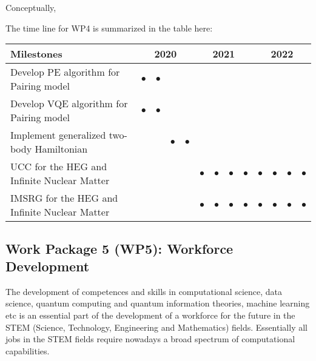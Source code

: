 \documentclass[10pt]{article}
\newcommand{\tbd}[1]{{\color{red}#1}}
\begin{document}
Conceptually, 




The time line for WP4 is summarized in the table here:
\begin{footnotesize}
\begin{center}
\begin{tabular}{|l|c|c|c|c|c|c|c|c|c|c|c|c|}
\hline
\multicolumn{1}{|l}{Milestones } & \multicolumn{4}{|c|}{ 2020 } & \multicolumn{4}{c|}{ 2021 } & \multicolumn{4}{c|}{ 2022 } \\
\hline
Develop PE algorithm for Pairing model &$\bullet$ &$\bullet$ && & & & & & & & &  \\
\hline
Develop VQE algorithm for Pairing model &$\bullet$  & $\bullet$ & & &  & & & & & &  \\
\hline
Implement generalized two-body Hamiltonian & & &$\bullet$  & $\bullet$ & & & & & & & &  \\

\hline
UCC for the HEG and Infinite Nuclear Matter & && & &$\bullet$  &$\bullet$ &$\bullet$  &$\bullet$  &$\bullet$  &$\bullet$ &$\bullet$  &$\bullet$   \\
\hline
IMSRG for the HEG and Infinite Nuclear Matter & && & &$\bullet$  &$\bullet$ &$\bullet$  &$\bullet$  &$\bullet$  &$\bullet$ &$\bullet$  &$\bullet$   \\
\hline

\end{tabular}
\end{center}
\end{footnotesize}

\subsection{Work Package 5 (WP5): Workforce Development}

The development of competences and skills in computational science, data science, quantum computing and quantum information theories, machine learning etc is an essential part of the development of a workforce for the future in the STEM (Science, Technology, Engineering and Mathematics) fields. Essentially all jobs in the STEM fields require nowadays a broad spectrum of computational capabilities. 
\end{document}
